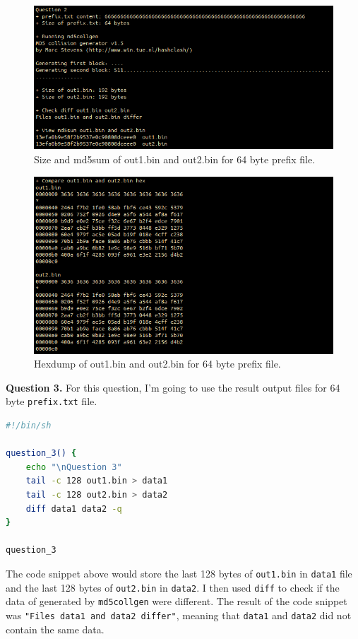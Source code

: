 \documentclass{article}
\begin{document}
\begin{figure}[!ht]
    \centering
    \includegraphics[scale=0.5]{task1.2.1.png}
    \caption{Size and md5sum of out1.bin and out2.bin for 64 byte prefix file.}
\end{figure}

\begin{figure}[!ht]
    \centering
    \includegraphics[scale=0.5]{task1.2.2.png}
    \caption{Hexdump of out1.bin and out2.bin for 64 byte prefix file.}
\end{figure}

\textbf{Question 3.} For this question, I'm going to use the result output files
for 64 byte \texttt{prefix.txt} file.

\begin{lstlisting}[language=bash]
#!/bin/sh

question_3() {
    echo "\nQuestion 3"
    tail -c 128 out1.bin > data1
    tail -c 128 out2.bin > data2
    diff data1 data2 -q
}

question_3
\end{lstlisting}

The code snippet above would store the last 128 bytes of \texttt{out1.bin} in
\texttt{data1} file and the last 128 bytes of \texttt{out2.bin} in \texttt{data2}.
I then used \texttt{diff} to check if the data of generated by \texttt{md5collgen}
were different. The result of the code snippet was \texttt{"Files data1 and data2 differ"},
meaning that \texttt{data1} and \texttt{data2} did not contain the same data.
\end{document}
